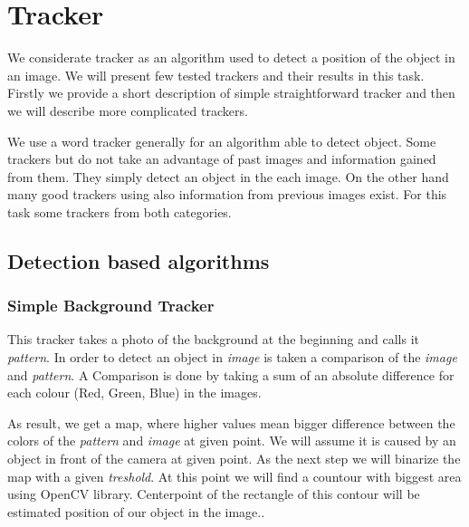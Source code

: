 \chapter{Tracker}

We considerate tracker as an algorithm used to detect a position of the object in
an image. We will present few tested trackers and their results in this task.
Firstly we provide a short description of simple straightforward tracker and
then we will describe more complicated trackers.

We use a word tracker generally for an algorithm able to detect object. Some
trackers but do not take an advantage of past images and information gained
from them. They simply detect an object in the each image. On the other hand
many good trackers using also information from previous images exist. For this
task some trackers from both categories.

\section {Detection based algorithms}

\subsection{Simple Background Tracker}

This tracker takes a photo of the background at the beginning and calls it
\emph{pattern}. In order to detect an object in \emph{image} is taken a
comparison of the \emph{image} and \emph{pattern}. A Comparison is done by
taking a sum of an absolute difference for each colour (Red, Green, Blue) in
the images. 

As result, we get a map, where higher values mean bigger difference between the
colors of the \emph{pattern} and \emph{image} at given point. We will assume it
is caused by an object in front of the camera at given point.  As the next step
we will binarize the map with a given \emph{treshold}. At this point we will
find a countour with biggest area using OpenCV library. Centerpoint of the
rectangle of this contour will be estimated position of our object in the
image..




